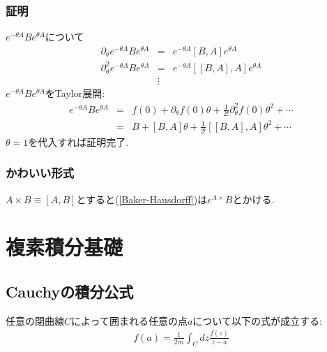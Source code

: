 \documentclass[10.5pt,a4paper]{jreport}
\begin{document}
\subsubsection{証明}
$e^{-\theta A}Be^{\theta A}$について
\begin{eqnarray}
  \partial_\theta e^{-\theta A}Be^{\theta A} &=& e^{-\theta A}[B, A]e^{\theta A}\\
  \partial_\theta^2 e^{-\theta A}Be^{\theta A} &=& e^{-\theta A}[[B, A], A]e^{\theta A}\\
  \nonumber&\vdots&
\end{eqnarray}
$e^{-\theta A}Be^{\theta A}$をTaylor展開:
\begin{eqnarray}
  e^{-\theta A}Be^{\theta A} &=& f(0) + \partial_\theta f(0)\theta + \frac{1}{2!}\partial^2_\theta f(0)\theta^2 + \cdots\\
  &=& B + [B, A]\theta + \frac{1}{2!}[[B, A], A]\theta^2 + \cdots\label{Baker-Hausdorff}
\end{eqnarray}
$\theta = 1$を代入すれば証明完了.
\subsubsection{かわいい形式}
$A\times B\equiv [A, B]$とすると(\ref{Baker-Hausdorff})は$e^{A\times}B$とかける.
\section{複素積分基礎}
\subsection{Cauchyの積分公式}
任意の閉曲線$C$によって囲まれる任意の点$a$について以下の式が成立する:
\begin{eqnarray}
  f(a) = \frac{1}{2\pi i}\int_C dz \frac{f(z)}{z-a}
\end{eqnarray}
\end{document}
